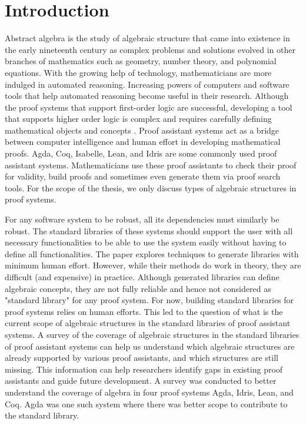 \chapter{Introduction}
Abstract algebra is the study of algebraic structure that came into existence in
the early nineteenth century as complex problems and solutions evolved in other
branches of mathematics such as geometry, number theory, and polynomial
equations. With the growing help of technology, mathematicians are more indulged
in automated reasoning. Increasing powers of computers and software tools that
help automated reasoning become useful in their research. Although the
proof systems that support first-order logic are successful, developing a tool
that supports higher order logic is complex and requires carefully defining
mathematical objects and concepts \cite{phillips2010automated}. Proof assistant
systems act as a bridge between computer intelligence and human effort in
developing mathematical proofs. Agda, Coq, Isabelle, Lean, and Idris are some
commonly used proof assistant systems. Mathematicians use these proof assistants
to check their proof for validity, build proofs and sometimes even generate them
via proof search tools. For the scope of the thesis, we only discuss types of
algebraic structures in proof systems.

For any software system to be robust, all its dependencies must similarly be
robust. The standard libraries of these systems should support the user with all
necessary functionalities to be able to use the system easily without having to
define all functionalities. The paper \cite{BuildingDiamond} explores techniques
to generate libraries with minimum human effort. However, while their methods do
work in theory, they are difficult (and expensive) in practice. Although
generated libraries can define algebraic concepts, they are not fully
reliable and hence not considered as "standard library" for any proof system.
For now, building standard libraries for proof systems relies on human efforts.
This led to the question of what is the current scope of algebraic structures in
the standard libraries of proof assistant systems. A survey of the coverage of
algebraic structures in the standard libraries of proof assistant systems can
help us understand which algebraic structures are already supported by various
proof assistants, and which structures are still missing. This information can
help researchers identify gaps in existing proof assistants and guide future
development. A survey was conducted to better understand the coverage of algebra
in four proof systems Agda, Idris, Lean, and Coq. Agda was one such system where
there was better scope to contribute to the standard library.

